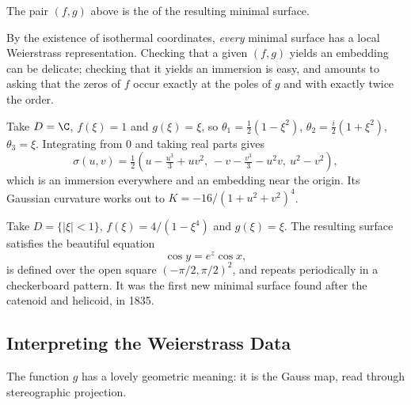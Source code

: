 \begin{definition}
    The pair $(f,g)$ above is the  of the resulting minimal surface.
\end{definition}

By the existence of isothermal coordinates, \emph{every} minimal surface has a local Weierstrass representation. Checking that a given $(f,g)$ yields an embedding can be delicate; checking that it yields an immersion is easy, and amounts to asking that the zeros of $f$ occur exactly at the poles of $g$ and with exactly twice the order.

\begin{example}
    Take $D = \C$, $f(\xi) = 1$ and $g(\xi) = \xi$, so $\theta_1 = \tfrac12(1-\xi^2)$, $\theta_2 = \tfrac i2(1+\xi^2)$, $\theta_3 = \xi$. Integrating from $0$ and taking real parts gives
    $$
    \sigma(u,v) = \tfrac12\left(u - \tfrac{u^3}{3} + uv^2,\ -v - \tfrac{v^3}{3} - u^2 v,\ u^2-v^2\right),
    $$
    which is an immersion everywhere and an embedding near the origin. Its Gaussian curvature works out to $K = -16/(1+u^2+v^2)^4$.
\end{example}

\begin{example}
    Take $D = \{|\xi| < 1\}$, $f(\xi) = 4/(1-\xi^4)$ and $g(\xi) = \xi$. The resulting surface satisfies the beautiful equation
    $$
    \cos y = e^z\cos x,
    $$
    is defined over the open square $(-\pi/2,\pi/2)^2$, and repeats periodically in a checkerboard pattern. It was the first new minimal surface found after the catenoid and helicoid, in 1835.
\end{example}

\subsection{Interpreting the Weierstrass Data}

The function $g$ has a lovely geometric meaning: it is the Gauss map, read through stereographic projection.

